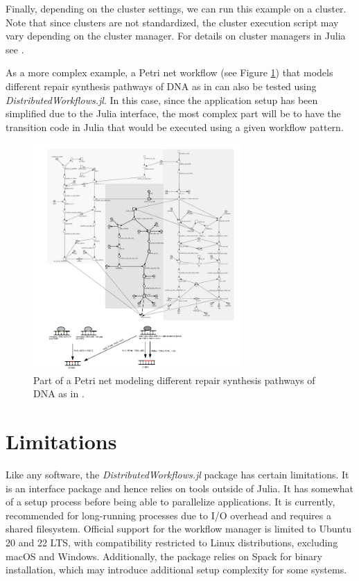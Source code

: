 \documentclass{juliacon}
\begin{document}
Finally, depending on the cluster settings, we can run this example on a cluster. 
Note that since clusters are not standardized, the cluster execution script may vary depending on the cluster manager. 
For details on cluster managers in Julia see \cite{JuliaClusterManagers}.\vskip 6pt

As a more complex example, a Petri net workflow (see Figure \ref{complex_example}) that models different repair synthesis pathways of DNA as in \cite{biology_example_petrinets_openaccess} can also be tested using \emph{DistributedWorkflows.jl}.
In this case, since the application setup has been simplified due to the Julia interface, the most complex part will be to have the transition code in Julia that would be executed using a given workflow pattern.

\begin{figure}[h]
    \centerline{\includegraphics[width=8cm]{example_proceedings2.jpg}}
    \caption{Part of a Petri net modeling different repair synthesis pathways of DNA as in \cite{biology_example_petrinets_openaccess}.}
    \label{complex_example}
\end{figure}


\section{Limitations}
\label{sec:limitations}

Like any software, the \emph{DistributedWorkflows.jl} package has certain limitations.
It is an interface package and hence relies on tools outside of Julia.
It has somewhat of a setup process before being able to parallelize applications.
It is currently, recommended for long-running processes due to I/O overhead and requires a shared filesystem.
Official support for the workflow manager is limited to Ubuntu 20 and 22 LTS, with compatibility restricted to Linux distributions, excluding macOS and Windows.
Additionally, the package relies on Spack for binary installation, which may introduce additional setup complexity for some systems.
\end{document}
